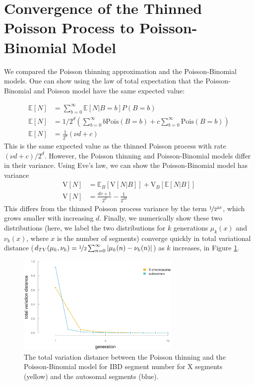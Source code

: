\documentclass[11pt]{article}
\newcommand{\E}{\mathbb{E}}
\newcommand{\V}{\text{V}}
\begin{document}
\printbibliography
\nocite{kram2015}
\nocite{dplyr}
\nocite{ggplot2}
\nocite{R}
\nocite{Rossum:1995:PRM:869369}
\nocite{C}
\nocite{colorspace}
\nocite{purrr}
\nocite{tidyr}

\newpage
\appendix

\section{Convergence of the Thinned Poisson Process to Poisson-Binomial Model}
\label{ap:pois-thin}

We compared the Poisson thinning approximation and the Poisson-Binomial models.
One can show using the law of total expectation that the Poisson-Binomial and
Poisson model have the same expected value:

\begin{align}
  \E[N] &= \sum_{b=0}^\infty \E[N | B = b]P(B = b)\\
  \E[N] &= 1/2^d \left( \sum_{b=0}^\infty b \text{Pois}(B = b) + c \sum_{b=0}^\infty \text{Pois}(B = b) \right) \\
  \E[N] &= \frac{1}{2^d} (\nu d + c)
\end{align}
%
This is the same expected value as the thinned Poisson process with rate $(\nu
d + c)/2^d$. However, the Poisson thinning and Poisson-Binomial models differ
in their variance. Using Eve's law, we can show the Poisson-Binomial model has
variance
%
\begin{align}
  \label{eq:n-variance}
  \V[N] &= \E_B[\V[N | B]] + \V_B[\E[N|B]]\\
  \V[N] &= \frac{dv + 1}{2^d} - \frac{1}{2^{2d}}
\end{align}
%
This differs from the thinned Poisson process variance by the term
$\nicefrac{1}{2^{2d}}$, which grows smaller with increasing $d$. Finally, we
numerically show these two distributions (here, we label the two distributions
for $k$ generations $\mu_k(x)$ and $\nu_k(x)$, where $x$ is the number of
segments) converge quickly in total variational distance ($d_{TV}(\mu_k, \nu_k) =
\nicefrac{1}{2}\sum_{n = 0}^\infty | \mu_k(n) - \nu_k(n) |$) as $k$ increases,
in Figure \ref{fig:total-var-dist}.

\begin{figure}[!ht]
  \centering
  \includegraphics[width=0.7\textwidth]{images/total-var-dist}

  \caption{The total variation distance between the Poisson thinning and the
  Poisson-Binomial model for IBD segment number for X segments (yellow) and the
autosomal segments (blue).}

\label{fig:total-var-dist}
\end{figure}
\end{document}
